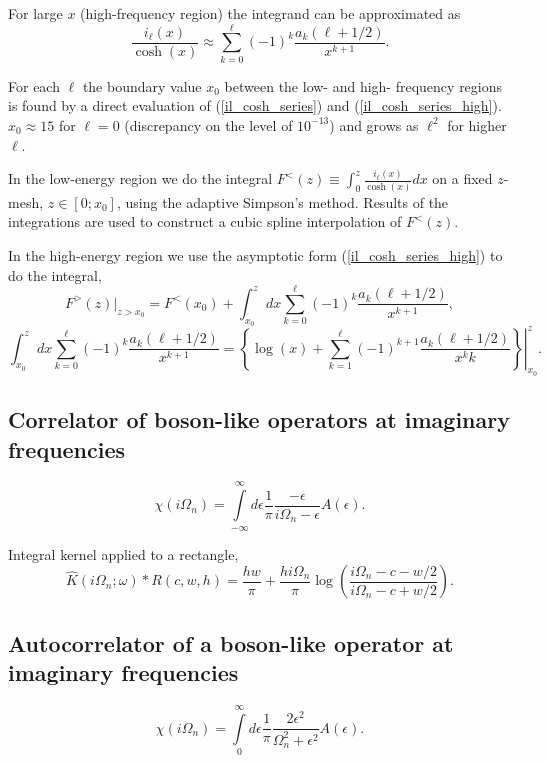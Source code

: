 \documentclass[]{article}
\begin{document}
For large $x$ (high-frequency region) the integrand can be approximated as
\begin{equation}\label{il_cosh_series_high}
	\frac{i_\ell(x)}{\cosh(x)} \approx
		\sum_{k=0}^\ell(-1)^k \frac{a_k(\ell+1/2)}{x^{k+1}}.
\end{equation}

For each $\ell$ the boundary value $x_0$ between the low- and high- frequency regions is found by a direct evaluation of (\ref{il_cosh_series}) and (\ref{il_cosh_series_high}). $x_0\approx15$ for $\ell=0$ (discrepancy on the level of $10^{-13}$) and grows as $\ell^2$ for higher $\ell$.

In the low-energy region we do the integral $F^<(z) \equiv \int_0^z \frac{i_\ell(x)}{\cosh(x)} dx$ on a fixed $z$-mesh, $z\in[0;x_0]$, using the adaptive Simpson's method. Results of the integrations are used to construct a cubic spline interpolation of $F^<(z)$.

In the high-energy region we use the asymptotic form (\ref{il_cosh_series_high}) to do the integral,
\begin{equation}
	F^>(z)|_{z>x_0} = F^<(x_0) +
		\int_{x_0}^z dx \sum_{k=0}^\ell(-1)^k \frac{a_k(\ell+1/2)}{x^{k+1}},
\end{equation}
\begin{equation}
	\int_{x_0}^z dx \sum_{k=0}^\ell(-1)^k \frac{a_k(\ell+1/2)}{x^{k+1}} =
	\left.\left\{
		\log(x) +
		\sum_{k=1}^\ell (-1)^{k+1}\frac{a_k(\ell+1/2)}{x^k k}
	\right\}\right|_{x_0}^z.
\end{equation}

\subsection{Correlator of boson-like operators at imaginary frequencies}
\begin{equation}
\chi(i\Omega_n) = \int\limits_{-\infty}^\infty
d\epsilon \frac{1}{\pi}\frac{-\epsilon}{i\Omega_n-\epsilon} A(\epsilon).
\end{equation}

Integral kernel applied to a rectangle,
\begin{equation}
\hat K(i\Omega_n;\omega)*R(c,w,h) = 
\frac{hw}{\pi} + \frac{hi\Omega_n}{\pi}\log\left(\frac{i\Omega_n - c - w/2}{i\Omega_n - c + w/2}\right).
\end{equation}

\subsection{Autocorrelator of a boson-like operator at imaginary frequencies}
\begin{equation}
\chi(i\Omega_n) = \int\limits_0^\infty
d\epsilon \frac{1}{\pi}\frac{2\epsilon^2}{\Omega_n^2+\epsilon^2} A(\epsilon).
\end{equation}
\end{document}
